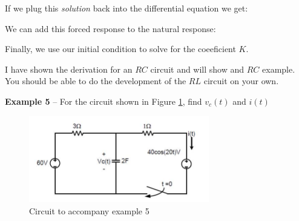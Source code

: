 \documentclass{handout}
\begin{document}
If we plug this {\em solution} back into the differential equation we get:

We can add this forced response to the natural response:
\soln{1in}{
\[
v(t) = Ke^{-\frac{t}{RC}}+\frac{V_A}{1+(\omega RC)^2}\cos (\omega t) +\frac{\omega RCV_A}{1+(\omega RC)^2} \sin (\omega t)
\]
}

Finally, we use our initial condition to solve for the coeeficient $K$.

I have shown the derivation for an $RC$ circuit and will show and $RC$ example.  You should be able to do the development of the $RL$ circuit on your own.

\newpage
\clearpage
\pagebreak

\textbf{Example 5} -- For the circuit shown in Figure \ref{fig: Example5}, find $v_c(t)$ and $i(t)$

\begin{figure} [h!]
\centering
\includegraphics[width=0.7\textwidth]{Example6.jpg}
\caption{Circuit to accompany example 5}
\label{fig: Example5}
\end{figure}
\end{document}
